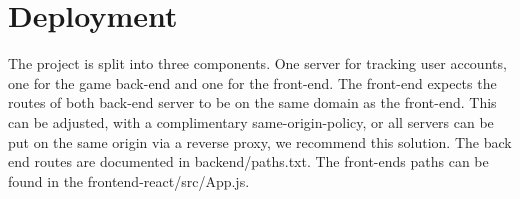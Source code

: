 \chapter{Deployment}
The project is split into three components. One server for tracking user accounts, one for the game back-end and one for the front-end. The front-end expects the routes of both back-end server to be on the same domain as the front-end. This can be adjusted, with a complimentary same-origin-policy, or all servers can be put on the same origin via a reverse proxy, we recommend this solution. The back end routes are documented in backend/paths.txt. The front-ends paths can be found in the frontend-react/src/App.js. 